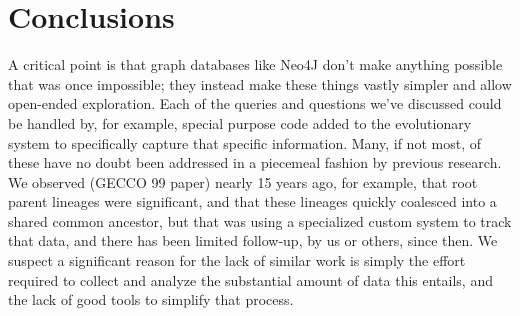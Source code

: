 \documentclass[12pt]{article}
\begin{document}







\section{Conclusions} \label{sec:conclusion}

A critical point is that graph databases like Neo4J don't make anything possible that was once impossible; 
they instead make these things vastly simpler and allow open-ended exploration. Each of the queries and questions
we've discussed could be handled by, for example, special purpose code added to the evolutionary system to specifically
capture that specific information. Many, if not most, of these have no doubt been addressed in a piecemeal fashion
by previous research. We observed (GECCO 99 paper) nearly 15 years ago, for example, that root parent lineages were
significant, and that these lineages quickly coalesced into a shared common ancestor, but that was using a specialized
custom system to track that data, and there has been limited follow-up, by us or others, since then. We suspect a
significant reason for the lack of similar work is simply the effort required to collect and analyze the substantial
amount of data this entails, and the lack of good tools to simplify that process.
\end{document}
